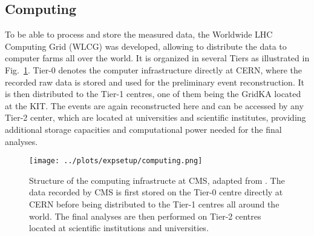 \subsection*{Computing}
To be able to process and store the measured data, the Worldwide LHC Computing Grid (WLCG) was developed, allowing to distribute the data to computer farms all over the world. It is organized in several Tiers as illustrated in Fig.~\ref{fig:expsetup:computing}. Tier-0 denotes the computer infrastructure directly at CERN, where the recorded raw data is stored and used for the preliminary event reconstruction. It is then distributed to the Tier-1 centres, one of them being the GridKA located at the KIT. The events are again reconstructed here and can be accessed by any Tier-2 center, which are located at universities and scientific institutes, providing additional storage capacities and computational power needed for the final analyses.
\begin{figure}
	\centering
	\texttt{[image: ../plots/expsetup/computing.png]}
	\caption[Structure of the computing infrastructe at CMS]{Structure of the computing infrastructe at CMS, adapted from \cite{computing_fig}. The data recorded by CMS is first stored on the Tier-0 centre directly at CERN before being distributed to the Tier-1 centres all around the world. The final analyses are then performed on Tier-2 centres located at scientific institutions and universities.}
	\label{fig:expsetup:computing}
\end{figure}